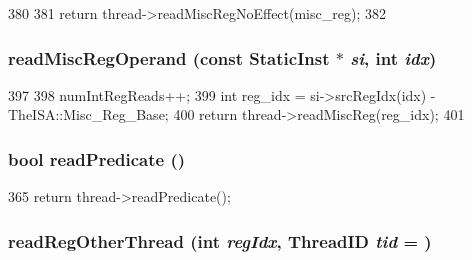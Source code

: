 \begin{DoxyCode}
380     {
381         return thread->readMiscRegNoEffect(misc_reg);
382     }
\end{DoxyCode}
\hypertarget{classBaseSimpleCPU_ac6d0dc1a63cede82f4242d43236a98db}{
\subsubsection[{readMiscRegOperand}]{ readMiscRegOperand (const {\bf StaticInst} $\ast$ {\em si}, \/  int {\em idx})}}
\label{classBaseSimpleCPU_ac6d0dc1a63cede82f4242d43236a98db}



\begin{DoxyCode}
397     {
398         numIntRegReads++;
399         int reg_idx = si->srcRegIdx(idx) - TheISA::Misc_Reg_Base;
400         return thread->readMiscReg(reg_idx);
401     }
\end{DoxyCode}
\hypertarget{classBaseSimpleCPU_a254cecc48d457ea298b08a8bb009f9cf}{
\subsubsection[{readPredicate}]{\setlength{\rightskip}{0pt plus 5cm}bool readPredicate ()}}
\label{classBaseSimpleCPU_a254cecc48d457ea298b08a8bb009f9cf}



\begin{DoxyCode}
365 { return thread->readPredicate(); }
\end{DoxyCode}
\hypertarget{classBaseSimpleCPU_ac4382c0931786c368f26b645332022e0}{
\subsubsection[{readRegOtherThread}]{ readRegOtherThread (int {\em regIdx}, \/  {\bf ThreadID} {\em tid} = {})}}
\label{classBaseSimpleCPU_ac4382c0931786c368f26b645332022e0}



